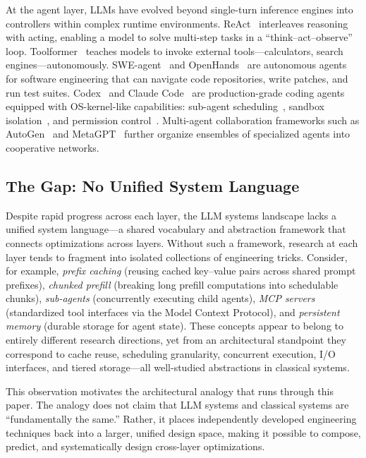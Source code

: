 \documentclass[11pt,a4paper]{article}
\begin{document}
At the agent layer, LLMs have evolved beyond single-turn inference engines into controllers within complex runtime environments.
ReAct~\cite{yao2023react} interleaves reasoning with acting, enabling a model to solve multi-step tasks in a ``think--act--observe'' loop.
Toolformer~\cite{schick2023toolformer} teaches models to invoke external tools---calculators, search engines---autonomously.
SWE-agent~\cite{sweagent2024} and OpenHands~\cite{openhands_paper_2025} are autonomous agents for software engineering that can navigate code repositories, write patches, and run test suites.
Codex~\cite{openai_codex_overview_2026} and Claude Code~\cite{anthropic_claudecode_overview_2026} are production-grade coding agents equipped with OS-kernel-like capabilities: sub-agent scheduling~\cite{openai_codex_subagents_2026,anthropic_claudecode_subagents_2026}, sandbox isolation~\cite{openai_codex_sandbox_2026,anthropic_claudecode_sandbox_2026}, and permission control~\cite{openai_codex_approvals_2026,anthropic_claudecode_security_2026}.
Multi-agent collaboration frameworks such as AutoGen~\cite{wu2023autogen} and MetaGPT~\cite{metagpt2023} further organize ensembles of specialized agents into cooperative networks.

\subsection{The Gap: No Unified System Language}

Despite rapid progress across each layer, the LLM systems landscape lacks a unified system language---a shared vocabulary and abstraction framework that connects optimizations across layers.
Without such a framework, research at each layer tends to fragment into isolated collections of engineering tricks.
Consider, for example, \emph{prefix caching} (reusing cached key--value pairs across shared prompt prefixes), \emph{chunked prefill} (breaking long prefill computations into schedulable chunks), \emph{sub-agents} (concurrently executing child agents), \emph{MCP servers} (standardized tool interfaces via the Model Context Protocol), and \emph{persistent memory} (durable storage for agent state).
These concepts appear to belong to entirely different research directions, yet from an architectural standpoint they correspond to cache reuse, scheduling granularity, concurrent execution, I/O interfaces, and tiered storage---all well-studied abstractions in classical systems.

This observation motivates the architectural analogy that runs through this paper.
The analogy does not claim that LLM systems and classical systems are ``fundamentally the same.''
Rather, it places independently developed engineering techniques back into a larger, unified design space, making it possible to compose, predict, and systematically design cross-layer optimizations.
\end{document}
